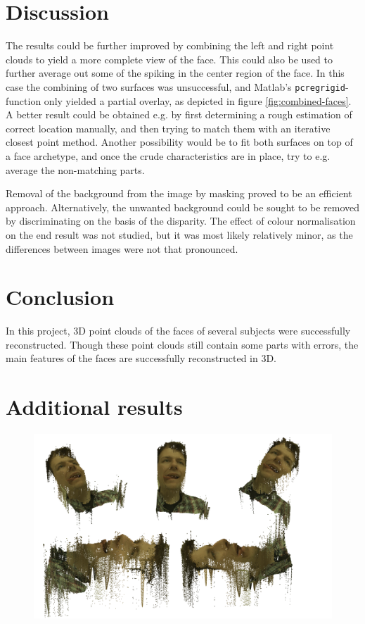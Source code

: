 \documentclass[journal]{IEEEtran}
\begin{document}
\section{Discussion}

The results could be further improved by combining the left and right point clouds to yield a more complete view of the face. 
This could also be used to further average out some of the spiking in the center region of the face.
In this case the combining of two surfaces was unsuccessful, and Matlab's \texttt{pcregrigid}-function only yielded a partial overlay, as depicted in figure \ref{fig:combined-faces}.
A better result could be obtained e.g. by first determining a rough estimation of correct location manually, and then trying to match them with an iterative closest point method.
Another possibility would be to fit both surfaces on top of a face archetype, and once the crude characteristics are in place, try to e.g. average the non-matching parts.

Removal of the background from the image by masking proved to be an efficient approach. 
Alternatively, the unwanted background could be sought to be removed by discriminating on the basis of the disparity. 
The effect of colour normalisation on the end result was not studied, but it was most likely relatively minor, as the differences between images were not that pronounced.


\section{Conclusion}
In this project, 3D point clouds of the faces of several subjects were successfully reconstructed. Though these point clouds still contain some parts with errors, the main features of the faces are successfully reconstructed in 3D.

\newpage
\appendices
\section{Additional results}
\FloatBarrier


\begin{figure}[h]
    \centering
    \includegraphics[width=0.8\linewidth]{result_S1_356}
	\label{fig:result_S1_356}
\end{figure}
\end{document}
